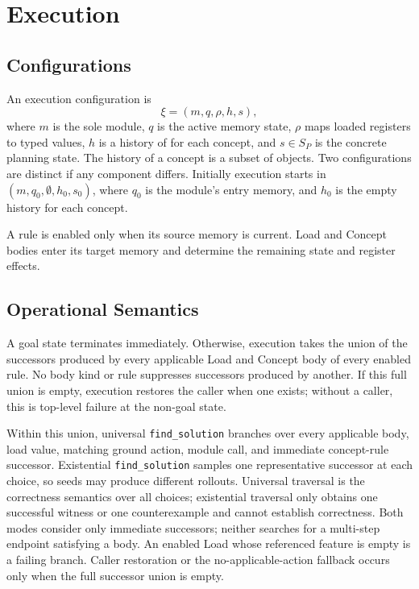 \documentclass[11pt]{article}
\newcommand{\code}[1]{\texttt{#1}}
\begin{document}
\section{Execution}

\subsection{Configurations}

An execution configuration is
\[
  \xi=(m,q,\rho,h,s),
\]
where $m$ is the sole module, $q$ is the active memory state, $\rho$ maps loaded
registers to typed values, $h$ is a history of for each concept, and $s\in S_P$ is the concrete planning state.
The history of a concept is a subset of objects.
Two configurations are distinct if any component differs.
Initially execution starts in
$(m,q_0,\emptyset,h_0,s_0)$, where $q_0$ is the module's entry memory, and $h_0$ is the empty history for each concept.

A rule is enabled only when its source memory is current. Load and Concept 
bodies enter its target memory and determine the remaining state and register
effects.

\subsection{Operational Semantics}

A goal state terminates immediately. Otherwise, execution takes the union of
the successors produced by every applicable Load and Concept body of every
enabled rule. No body kind or rule suppresses successors produced by another.
If this full union is empty, execution restores the caller when one exists;
without a caller, this is top-level failure at the non-goal state.

Within this union, universal \code{find_solution} branches over every
applicable body, load value, matching ground action, module call, and immediate concept-rule
successor. Existential \code{find_solution} samples one representative successor
at each choice, so seeds may produce different rollouts. Universal traversal is
the correctness semantics over all choices; existential traversal only obtains
one successful witness or one counterexample and cannot establish correctness.
Both modes consider only immediate successors; neither searches for a multi-step
endpoint satisfying a body. An enabled Load whose referenced feature is empty
is a failing branch.
Caller restoration or the no-applicable-action fallback occurs
only when the full successor union is empty.
\end{document}
